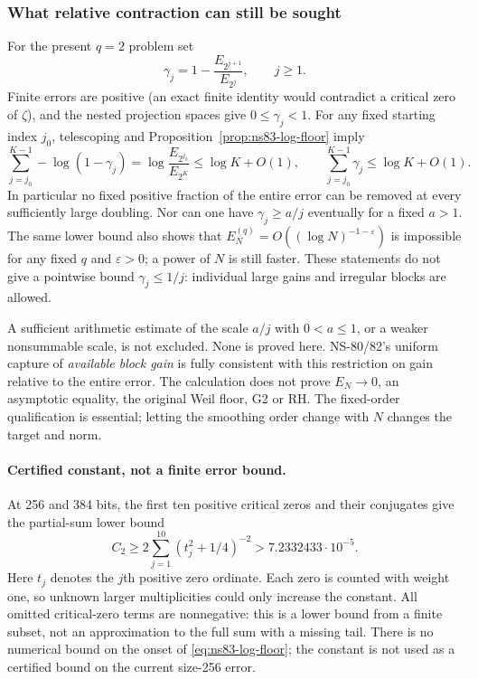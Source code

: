 \documentclass[11pt]{article}
\theoremstyle{remark}
\begin{document}
\subsubsection*{What relative contraction can still be sought}
For the present $q=2$ problem set
\[
 \gamma_j=1-\frac{E_{2^{j+1}}}{E_{2^j}},\qquad j\geq1.
\]
Finite errors are positive (an exact finite identity would contradict a
critical zero of $\zeta$), and the nested projection spaces give
$0\leq\gamma_j<1$. For any fixed starting index $j_0$, telescoping and
Proposition~\ref{prop:ns83-log-floor} imply
\begin{equation}
 \sum_{j=j_0}^{K-1}-\log(1-\gamma_j)
 =\log\frac{E_{2^{j_0}}}{E_{2^K}}
 \leq\log K+O(1),\qquad
 \sum_{j=j_0}^{K-1}\gamma_j\leq\log K+O(1).
 \label{eq:ns83-gain-budget}
\end{equation}
In particular no fixed positive fraction of the entire error can be
removed at every sufficiently large doubling. Nor can one have
$\gamma_j\geq a/j$ eventually for a fixed $a>1$.
The same lower bound also shows that $E_N^{(q)}=O((\log N)^{-1-\varepsilon})$ is impossible
for any fixed $q$ and $\varepsilon>0$; a power of $N$ is still faster.
These statements do not give a pointwise bound $\gamma_j\leq1/j$:
individual large gains and irregular blocks are allowed.

A sufficient arithmetic estimate of the scale $a/j$ with $0<a\leq1$,
or a weaker nonsummable scale, is not excluded. None is proved here.
NS-80/82's uniform capture of \emph{available block gain} is fully
consistent with this restriction on gain relative to the entire error.
The calculation does not prove $E_N\to0$, an asymptotic equality, the
original Weil floor, G2 or RH. The fixed-order qualification is essential;
letting the smoothing order change with $N$ changes the target and norm.

\paragraph{Certified constant, not a finite error bound.}
At 256 and 384 bits, the first ten positive critical zeros and their
conjugates give the partial-sum lower bound
\[
 C_2\geq2\sum_{j=1}^{10}(t_j^2+1/4)^{-2}
 >7.2332433\cdot10^{-5}.
\]
Here $t_j$ denotes the $j$th positive zero ordinate. Each zero is
counted with weight one, so unknown
larger multiplicities could only increase the constant. All omitted
critical-zero terms are nonnegative: this is a lower bound from a finite
subset, not an approximation to the full sum with a missing tail.
There is no numerical bound on the onset of
\eqref{eq:ns83-log-floor}; the constant is not used as a certified bound
on the current size-256 error.
\end{document}
